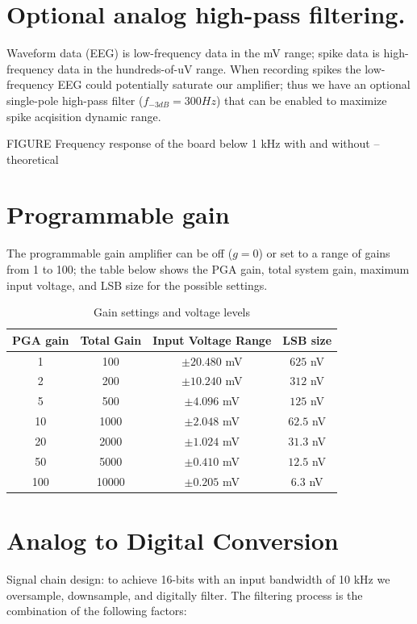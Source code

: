 \section{Optional analog high-pass filtering.}
Waveform data (EEG) is low-frequency data in the mV range; spike data
is high-frequency data in the hundreds-of-uV range. When recording
spikes the low-frequency EEG could potentially saturate our amplifier;
thus we have an optional single-pole high-pass filter ($f_{-3dB}=300
Hz$) that can be enabled to maximize spike acqisition dynamic range.

FIGURE Frequency response of the board below 1 kHz with and without --
theoretical


\section{Programmable gain}
The programmable gain amplifier can be off ($g=0$) or set to a range
of gains from 1 to 100; the table below shows the PGA gain, total
system gain, maximum input voltage, and LSB size for the possible
settings.

\begin{table}
\begin{centering}
\begin{tabular}[h!]{|c|c|c|c|}
\hline
PGA gain & Total Gain & Input Voltage Range & LSB size \\
\hline
1 & 100 & $\pm20.480$ mV & $625$ nV \\
2 & 200 & $\pm10.240$ mV & $312$ nV \\
5 & 500 & $\pm4.096$ mV & $125$ nV \\
10 & 1000 & $\pm2.048$ mV & $62.5$ nV \\
20 & 2000 & $\pm1.024$ mV & $31.3$ nV \\
50 & 5000 & $\pm0.410$ mV & $12.5$ nV \\
100 & 10000 & $\pm0.205$ mV & $6.3$ nV \\
\hline
\end{tabular}
\end{centering}
\caption{Gain settings and voltage levels}
\end{table}

\section{Analog to Digital Conversion}
Signal chain design: to achieve 16-bits with an input bandwidth of 10
kHz we oversample, downsample, and digitally filter. The filtering
process is the combination of the following factors:

